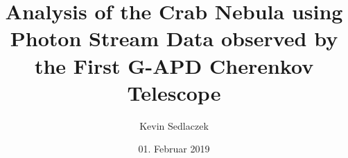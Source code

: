 \documentclass[
  tucolor,
  BCOR=12mm,     %
  parskip=half,  %
  open=any,      %
  cleardoublepage=plain,  %
]{tudothesis}
\author{Kevin Sedlaczek}
\title{Analysis of the Crab Nebula using Photon Stream Data observed by the First G-APD Cherenkov Telescope}
\date{01. Februar 2019}
\begin{document}
\frontmatter
\maketitle

\makecorrectorpage


\tableofcontents

\mainmatter












\appendix


\backmatter
\printbibliography

\cleardoublepage


\end{document}
